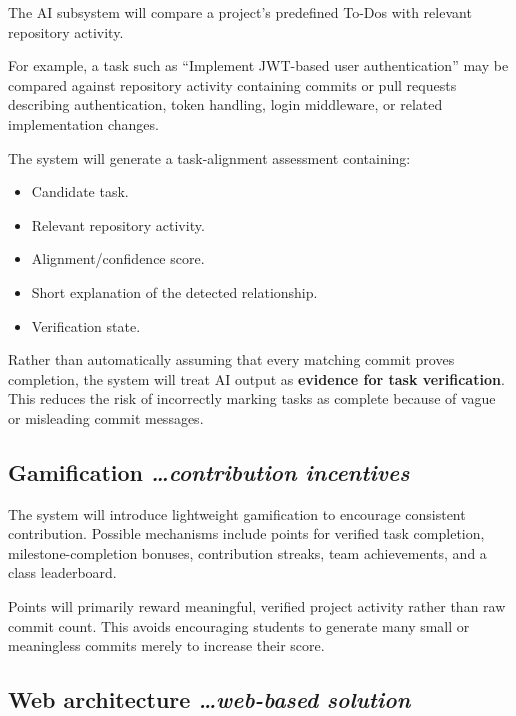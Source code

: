 \documentclass[11pt,a4paper]{article}
\newcommand{\BvrHint}[1]{%
  \texorpdfstring{%
    {\normalfont\normalsize\itshape\hfill #1}%
  }{}%
}
\begin{document}
The AI subsystem will compare a project's predefined To-Dos with relevant repository activity.

For example, a task such as ``Implement JWT-based user authentication'' may be compared against repository activity containing commits or pull requests describing authentication, token handling, login middleware, or related implementation changes.

The system will generate a task-alignment assessment containing:

\begin{itemize}[leftmargin=0.7cm]

    \item Candidate task.

    \item Relevant repository activity.

    \item Alignment/confidence score.

    \item Short explanation of the detected relationship.

    \item Verification state.

\end{itemize}

Rather than automatically assuming that every matching commit proves completion, the system will treat AI output as \textbf{evidence for task verification}. This reduces the risk of incorrectly marking tasks as complete because of vague or misleading commit messages.


\subsection{Gamification%
  \BvrHint{\ldots contribution incentives}}

The system will introduce lightweight gamification to encourage consistent contribution. Possible mechanisms include points for verified task completion, milestone-completion bonuses, contribution streaks, team achievements, and a class leaderboard.

Points will primarily reward meaningful, verified project activity rather than raw commit count. This avoids encouraging students to generate many small or meaningless commits merely to increase their score.


\subsection{Web architecture%
  \BvrHint{\ldots web-based solution}}
\end{document}
